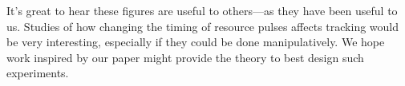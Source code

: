 \documentclass[11pt]{article}
\begin{document}
It's great to hear these figures are useful to others---as they have been useful to us. Studies of how changing the timing of resource pulses affects tracking would be very interesting, especially if they could be done manipulatively. We hope work inspired by our paper might provide the theory to best design such experiments. \\



\end{document}
